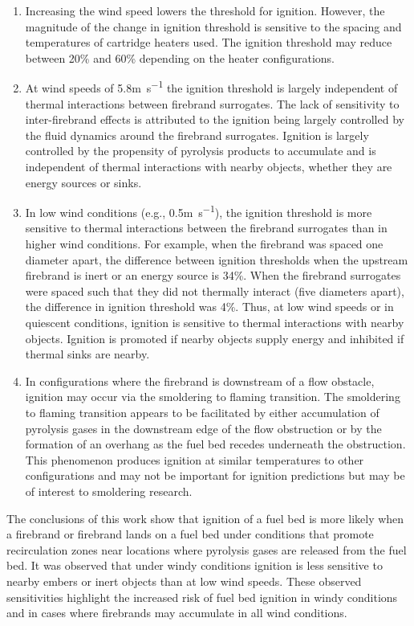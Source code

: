         \begin{enumerate}
            \item Increasing the wind speed lowers the threshold for ignition. However, the magnitude of the change in ignition threshold is sensitive to the spacing and temperatures of cartridge heaters used. The ignition threshold may reduce between 20\% and 60\% depending on the heater configurations.
            
            \item At wind speeds of 5.8\si{\meter\per\second} the ignition threshold is largely independent of thermal interactions between firebrand surrogates. The lack of sensitivity to inter-firebrand effects is attributed to the ignition being largely controlled by the fluid dynamics around the firebrand surrogates. Ignition is largely controlled by the propensity of pyrolysis products to accumulate and is independent of thermal interactions with nearby objects, whether they are energy sources or sinks. 
            
            \item In low wind conditions (e.g., 0.5\si{\meter\per\second}), the ignition threshold is more sensitive to thermal interactions between the firebrand surrogates than in higher wind conditions. For example, when the firebrand was spaced one diameter apart, the difference between ignition thresholds when the upstream firebrand is inert or an energy source is 34\%. When the firebrand surrogates were spaced such that they did not thermally interact (five diameters apart), the difference in ignition threshold was 4\%. Thus, at low wind speeds or in quiescent conditions, ignition is sensitive to thermal interactions with nearby objects. Ignition is promoted if nearby objects supply energy and inhibited if thermal sinks are nearby. 
            
            \item In configurations where the firebrand is downstream of a flow obstacle, ignition may occur via the smoldering to flaming transition. The smoldering to flaming transition appears to be facilitated by either accumulation of pyrolysis gases in the downstream edge of the flow obstruction or by the formation of an overhang as the fuel bed recedes underneath the obstruction. This phenomenon produces ignition at similar temperatures to other configurations and may not be important for ignition predictions but may be of interest to smoldering research. 
        \end{enumerate}
    The conclusions of this work show that ignition of a fuel bed is more likely when a firebrand or firebrand lands on a fuel bed under conditions that promote recirculation zones near locations where pyrolysis gases are released from the fuel bed. It was observed that under windy conditions ignition is less sensitive to nearby embers or inert objects than at low wind speeds. These observed sensitivities highlight the increased risk of fuel bed ignition in windy conditions and in cases where firebrands may accumulate in all wind conditions. 